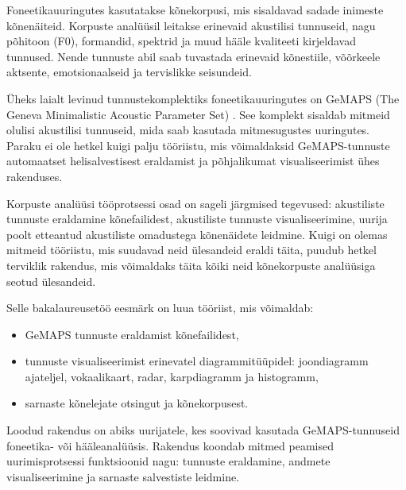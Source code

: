Foneetikauuringutes kasutatakse kõnekorpusi, mis sisaldavad sadade inimeste kõnenäiteid. Korpuste analüüsil leitakse erinevaid akustilisi tunnuseid, nagu põhitoon (F0), formandid, spektrid ja muud hääle kvaliteeti kirjeldavad tunnused. Nende tunnuste abil saab tuvastada erinevaid kõnestiile, võõrkeele aktsente, emotsionaalseid ja tervislikke seisundeid.

Üheks laialt levinud tunnustekomplektiks foneetikauuringutes on GeMAPS (The Geneva Minimalistic Acoustic Parameter Set) \cite{eyben2016gemaps}. See komplekt sisaldab mitmeid olulisi akustilisi tunnuseid, mida saab kasutada mitmesugustes uuringutes. Paraku ei ole hetkel kuigi palju tööriistu, mis võimaldaksid GeMAPS-tunnuste automaatset helisalvestisest eraldamist ja põhjalikumat visualiseerimist ühes rakenduses.

Korpuste analüüsi tööprotsessi osad on sageli järgmised tegevused: akustiliste tunnuste eraldamine kõnefailidest, akustiliste tunnuste visualiseerimine, uurija poolt etteantud akustiliste omadustega kõnenäidete leidmine. Kuigi on olemas mitmeid tööriistu, mis suudavad neid ülesandeid eraldi täita, puudub hetkel terviklik rakendus, mis võimaldaks täita kõiki neid kõnekorpuste analüüsiga seotud ülesandeid.

Selle bakalaureusetöö eesmärk on luua tööriist, mis võimaldab:
\begin{itemize}
    \item GeMAPS tunnuste eraldamist kõnefailidest,
    \item tunnuste visualiseerimist erinevatel diagrammitüüpidel: joondiagramm ajateljel, vokaalikaart, radar, karpdiagramm ja histogramm,
    \item sarnaste kõnelejate otsingut ja kõnekorpusest.
\end{itemize}

Loodud rakendus on abiks uurijatele, kes soovivad kasutada GeMAPS-tunnuseid foneetika- või hääleanalüüsis. Rakendus koondab mitmed peamised uurimisprotsessi funktsioonid nagu: tunnuste eraldamine, andmete visualiseerimine ja sarnaste salvestiste leidmine.
